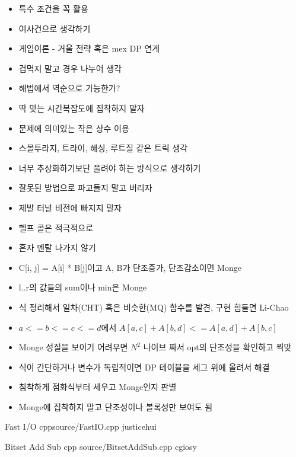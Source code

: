\documentclass[landscape, 10pt, a4paper, oneside, twocolumn]{extarticle}
\begin{document}
\begin{itemize}
    \item 특수 조건을 꼭 활용
    \item 여사건으로 생각하기
    \item 게임이론 - 거울 전략 혹은 mex DP 연계
    \item 겁먹지 말고 경우 나누어 생각
    \item 해법에서 역순으로 가능한가?
    \item 딱 맞는 시간복잡도에 집착하지 말자
    \item 문제에 의미있는 작은 상수 이용
    \item 스몰투라지, 트라이, 해싱, 루트질 같은 트릭 생각
    \item 너무 추상화하기보단 풀려야 하는 방식으로 생각하기
    \item 잘못된 방법으로 파고들지 말고 버리자
    \item 제발 터널 비전에 빠지지 말자
    \item 헬프 콜은 적극적으로
    \item 혼자 멘탈 나가지 않기
\end{itemize}

\begin{itemize}
    \item C[i, j] = A[i] * B[j]이고 A, B가 단조증가, 단조감소이면 Monge
    \item l..r의 값들의 sum이나 min은 Monge

    \item 식 정리해서 일차(CHT) 혹은 비슷한(MQ) 함수를 발견, 구현 힘들면 Li-Chao
    \item $a <= b <= c <= d$에서 $A[a,c] + A[b,d] <= A[a,d] + A[b,c]$
    \item Monge 성질을 보이기 어려우면 $N^2$ 나이브 짜서 opt의 단조성을 확인하고 찍맞
    \item 식이 간단하거나 변수가 독립적이면 DP 테이블을 세그 위에 올려서 해결
    \item 침착하게 점화식부터 세우고 Monge인지 판별
    \item Monge에 집착하지 말고 단조성이나 볼록성만 보여도 됨
\end{itemize}

\Algorithm
{Fast I/O}
{}
{}
{cpp}{source/FastIO.cpp}
{justicehui}

\Algorithm
{Bitset Add Sub}
{}
{}
{cpp}
{source/BitsetAddSub.cpp}
{cgiosy}
\end{document}
